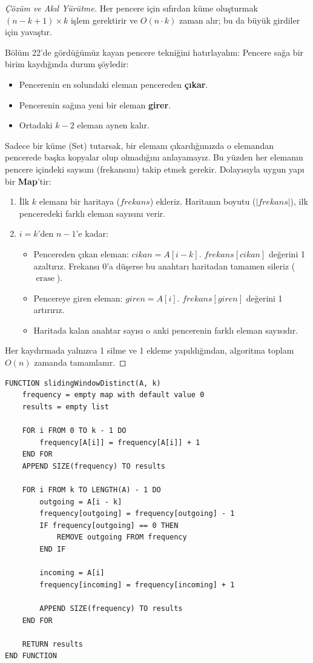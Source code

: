 \begin{proof}[Çözüm ve Akıl Yürütme]
Her pencere için sıfırdan küme oluşturmak $(n - k + 1) \times k$ işlem gerektirir ve $O(n \cdot k)$ zaman alır; bu da büyük girdiler için yavaştır.

Bölüm 22'de gördüğümüz kayan pencere tekniğini hatırlayalım: Pencere sağa bir birim kaydığında durum şöyledir:
\begin{itemize}
    \item Pencerenin en solundaki eleman pencereden \textbf{çıkar}.
    \item Pencerenin sağına yeni bir eleman \textbf{girer}.
    \item Ortadaki $k - 2$ eleman aynen kalır.
\end{itemize}
Sadece bir küme (Set) tutarsak, bir elemanı çıkardığımızda o elemandan pencerede başka kopyalar olup olmadığını anlayamayız. Bu yüzden her elemanın pencere içindeki sayısını (frekansını) takip etmek gerekir. Dolayısıyla uygun yapı bir \textbf{Map}'tir:

\begin{enumerate}
    \item İlk $k$ elemanı bir haritaya ($frekans$) ekleriz. Haritanın boyutu ($|frekans|$), ilk penceredeki farklı eleman sayısını verir.
    \item $i = k$'den $n - 1$'e kadar:
    \begin{itemize}
        \item Pencereden çıkan eleman: $cikan = A[i - k]$. $frekans[cikan]$ değerini 1 azaltırız. Frekansı $0$'a düşerse bu anahtarı haritadan tamamen sileriz ($\operatorname{erase}$).
        \item Pencereye giren eleman: $giren = A[i]$. $frekans[giren]$ değerini 1 artırırız.
        \item Haritada kalan anahtar sayısı o anki pencerenin farklı eleman sayısıdır.
    \end{itemize}
\end{enumerate}
Her kaydırmada yalnızca 1 silme ve 1 ekleme yapıldığından, algoritma toplam $O(n)$ zamanda tamamlanır.
\end{proof}

\begin{lstlisting}
FUNCTION slidingWindowDistinct(A, k)
    frequency = empty map with default value 0
    results = empty list

    FOR i FROM 0 TO k - 1 DO
        frequency[A[i]] = frequency[A[i]] + 1
    END FOR
    APPEND SIZE(frequency) TO results

    FOR i FROM k TO LENGTH(A) - 1 DO
        outgoing = A[i - k]
        frequency[outgoing] = frequency[outgoing] - 1
        IF frequency[outgoing] == 0 THEN
            REMOVE outgoing FROM frequency
        END IF

        incoming = A[i]
        frequency[incoming] = frequency[incoming] + 1

        APPEND SIZE(frequency) TO results
    END FOR

    RETURN results
END FUNCTION\end{lstlisting}

